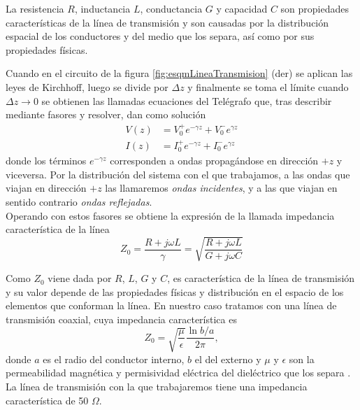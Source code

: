 \documentclass[11pt,a4paper,twoside,pdf]{article}
\numberwithin{equation}{section}
\begin{document}
La resistencia $R$, inductancia $L$, conductancia $G$ y capacidad $C$ son propiedades características de la línea de transmisión y son causadas por la distribución espacial de los conductores y del medio que los separa, así como por sus propiedades físicas. 

Cuando en el circuito de la figura \ref{fig:esqmLineaTransmision} (der) se aplican las leyes de Kirchhoff, luego se divide por $\Delta z$ y finalmente se toma el límite cuando $\Delta z\rightarrow0$ se obtienen las llamadas ecuaciones del Telégrafo \cite{pozar} que, tras describir mediante fasores y resolver, dan como solución
\begin{equation}\label{eq:solViajeras}
    \begin{split}
        V(z) &= V_0^+e^{-\gamma z} + V_0^-e^{\gamma z} \\
        I(z) &= I_0^+e^{-\gamma z} + I_0^-e^{\gamma z}
    \end{split}
\end{equation}
\noindent donde los términos $e^{-\gamma z}$ corresponden a ondas propagándose en dirección $+z$ y viceversa. Por la distribución del sistema con el que trabajamos, a las ondas que viajan en dirección $+z$ las llamaremos \textit{ondas incidentes}, y a las que viajan en sentido contrario \textit{ondas reflejadas}.\\

Operando con estos fasores se obtiene la expresión de la llamada impedancia característica de la línea
\begin{equation}
    Z_0 = \frac{R+j\omega L}{\gamma} = \sqrt{\frac{R+j\omega L}{G+j\omega C}}
\end{equation}

Como $Z_0$ viene dada por $R$, $L$, $G$ y $C$, es característica de la línea de transmisión y su valor depende de las propiedades físicas y distribución en el espacio de los elementos que conforman la línea. En nuestro caso tratamos con una línea de transmisión coaxial, cuya impedancia característica es
\begin{equation}\label{impedCaractCoax}
    Z_0 = \sqrt{\frac{\mu}{\epsilon}} \frac{\ln b/a}{2\pi},
\end{equation}
\noindent donde $a$ es el radio del conductor interno, $b$ el del externo y $\mu$ y $\epsilon$ son la permeabilidad magnética y permisividad eléctrica del dieléctrico que los separa \cite{pozar}. La línea de transmisión con la que trabajaremos tiene una impedancia característica de 50 $\Omega$.\\
\end{document}
